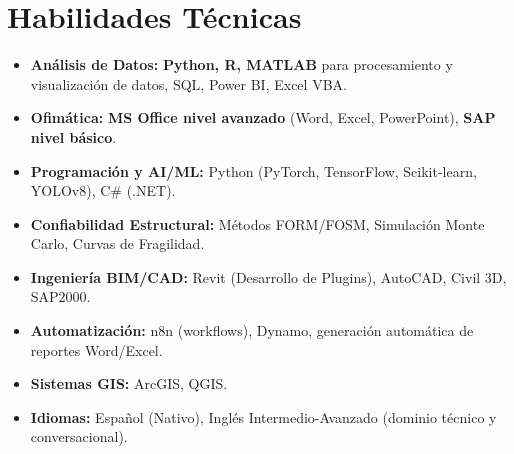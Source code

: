 \documentclass[10pt, a4paper]{article}
\begin{document}
\section*{Habilidades Técnicas}
\begin{itemize}
    \item \textbf{Análisis de Datos:} \textbf{Python, R, MATLAB} para procesamiento y visualización de datos, SQL, Power BI, Excel VBA.
    \item \textbf{Ofimática:} \textbf{MS Office nivel avanzado} (Word, Excel, PowerPoint), \textbf{SAP nivel básico}.
    \item \textbf{Programación y AI/ML:} Python (PyTorch, TensorFlow, Scikit-learn, YOLOv8), C\# (.NET).
    \item \textbf{Confiabilidad Estructural:} Métodos FORM/FOSM, Simulación Monte Carlo, Curvas de Fragilidad.
    \item \textbf{Ingeniería BIM/CAD:} Revit (Desarrollo de Plugins), AutoCAD, Civil 3D, SAP2000.
    \item \textbf{Automatización:} n8n (workflows), Dynamo, generación automática de reportes Word/Excel.
    \item \textbf{Sistemas GIS:} ArcGIS, QGIS.
    \item \textbf{Idiomas:} Español (Nativo), Inglés Intermedio-Avanzado (dominio técnico y conversacional).
\end{itemize}

\end{document}

